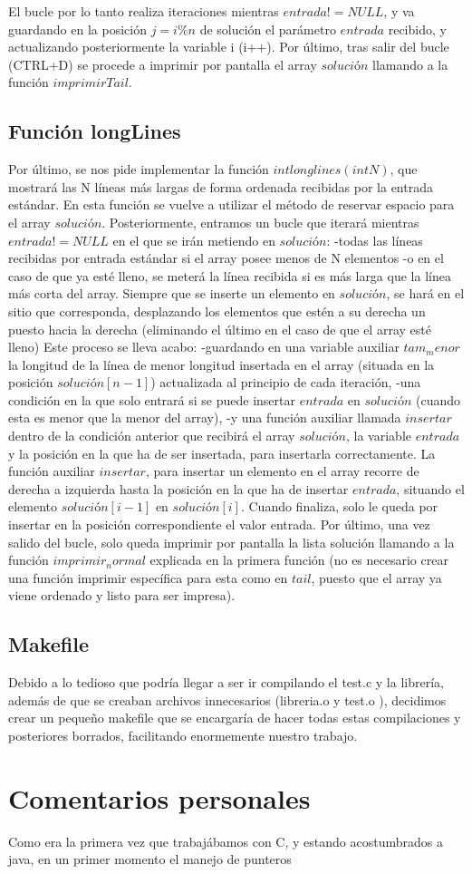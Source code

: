El bucle por lo tanto realiza iteraciones mientras $entrada != NULL$, y va guardando en la posición $j=i\%n$ de solución el parámetro $entrada$ recibido, y actualizando posteriormente la variable i (i++).
Por último, tras salir del bucle (CTRL+D) se procede a imprimir por pantalla el array $solución$ llamando a la función $imprimirTail$.
\section{Función longLines}
Por último, se nos pide implementar la función $int longlines(int N)$, que mostrará las N líneas más largas de forma ordenada recibidas por la entrada estándar.
En esta función se vuelve a utilizar el método de reservar espacio para el array $solución$. Posteriormente, entramos un bucle que iterará mientras $entrada != NULL$ en el que se irán metiendo en $solución$:
	-todas las líneas recibidas por entrada estándar si el array posee menos de N elementos
	-o en el caso de que ya esté lleno, se meterá la línea recibida si es más larga que la línea más corta del array.
Siempre que se inserte un elemento en $solución$, se hará en el sitio que corresponda, desplazando los elementos que estén a su derecha un puesto hacia la derecha (eliminando el último en el caso de que el array esté lleno)
Este proceso se lleva acabo:
	-guardando en una variable auxiliar $tam_menor$ la longitud de la línea de menor longitud insertada en el array (situada en la posición $solución[n-1]$) actualizada al principio de cada iteración,
	-una condición en la que solo entrará si se puede insertar $entrada$ en $solución$ (cuando esta es menor que la menor del array),
	-y una función auxiliar llamada $insertar$ dentro de la condición anterior que recibirá el array $solución$, la variable $entrada$ y la posición en la que ha de ser insertada, para insertarla correctamente.
La función auxiliar $insertar$, para insertar un elemento en el array recorre de derecha a izquierda hasta la posición en la que ha de insertar $entrada$, situando el elemento $solución[i-1]$ en $solución[i]$. Cuando finaliza, solo le queda por insertar en la posición correspondiente el valor entrada.
Por último, una vez salido del bucle, solo queda imprimir por pantalla la lista solución llamando a la función $imprimir_normal$ explicada en la primera función (no es necesario crear una función imprimir específica para esta como en $tail$, puesto que el array ya viene ordenado y listo para ser impresa).
\section{Makefile}
Debido a lo tedioso que podría llegar a ser ir compilando el test.c y la librería, además de que se creaban archivos innecesarios (libreria.o y test.o ), decidimos crear un pequeño makefile que se encargaría de hacer todas estas compilaciones y posteriores borrados, facilitando enormemente nuestro trabajo.
\chapter{Comentarios personales}
Como era la primera vez que trabajábamos con C, y estando acostumbrados a java, en un primer momento el manejo de punteros  